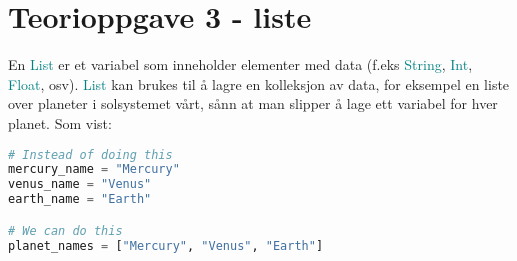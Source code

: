 \documentclass[10pt,a4paper]{article}
\begin{document}
\section*{Teorioppgave 3 - liste}
En \textcolor{teal}{List} er et variabel som inneholder elementer med data (f.eks \textcolor{teal}{String}, \textcolor{teal}{Int}, \textcolor{teal}{Float}, osv). \textcolor{teal}{List} kan brukes til å lagre en kolleksjon av data, for eksempel en liste over planeter i solsystemet vårt, sånn at man slipper å lage ett variabel for hver planet. Som vist:
\begin{lstlisting}[language=Python]
# Instead of doing this
mercury_name = "Mercury"
venus_name = "Venus"
earth_name = "Earth"

# We can do this
planet_names = ["Mercury", "Venus", "Earth"]
\end{lstlisting}
\end{document}
